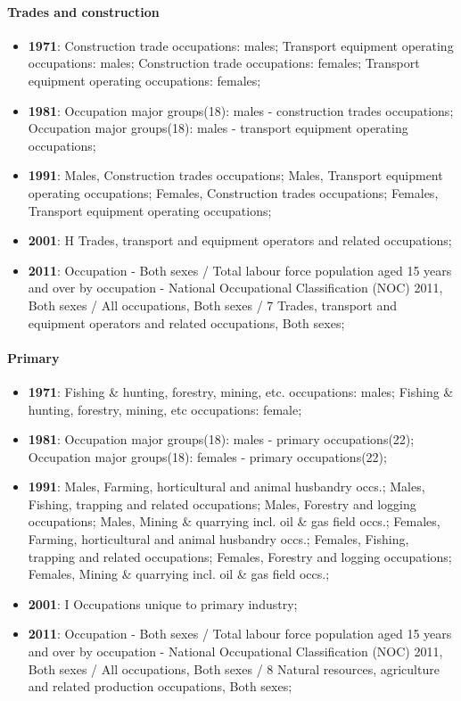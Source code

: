 \documentclass[a4paper]{article}
\begin{document}
\paragraph{Trades and construction}
\begin{itemize}
   \item{\textbf{1971}:  Construction trade occupations: males; Transport equipment operating occupations: males; Construction trade occupations: females; Transport equipment operating occupations: females;}
   \item{\textbf{1981}:  Occupation major groups(18): males - construction trades occupations; Occupation major groups(18): males - transport equipment operating occupations;}
   \item{\textbf{1991}:  Males, Construction trades occupations; Males, Transport equipment operating occupations; Females, Construction trades occupations; Females, Transport equipment operating occupations;}
   \item{\textbf{2001}:  H Trades, transport and equipment operators and related occupations;}
   \item{\textbf{2011}:  Occupation - Both sexes / Total labour force population aged 15 years and over by occupation - National Occupational Classification (NOC) 2011, Both sexes / All occupations, Both sexes / 7 Trades, transport and equipment operators and related occupations, Both sexes;}
\end{itemize}

\paragraph{Primary}
\begin{itemize}
   \item{\textbf{1971}:  Fishing \& hunting, forestry, mining, etc. occupations: males; Fishing \& hunting, forestry, mining, etc occupations: female;}
   \item{\textbf{1981}:  Occupation major groups(18): males - primary occupations(22); Occupation major groups(18): females - primary occupations(22);}
   \item{\textbf{1991}:  Males, Farming, horticultural and animal husbandry occs.; Males, Fishing, trapping and related occupations; Males, Forestry and logging occupations; Males, Mining \& quarrying incl. oil \& gas field occs.; Females, Farming, horticultural and animal husbandry occs.; Females, Fishing, trapping and related occupations; Females, Forestry and logging occupations; Females, Mining \& quarrying incl. oil \& gas field occs.;}
   \item{\textbf{2001}:  I Occupations unique to primary industry;}
   \item{\textbf{2011}:  Occupation - Both sexes / Total labour force population aged 15 years and over by occupation - National Occupational Classification (NOC) 2011, Both sexes / All occupations, Both sexes / 8 Natural resources, agriculture and related production occupations, Both sexes;}
\end{itemize}
\end{document}
